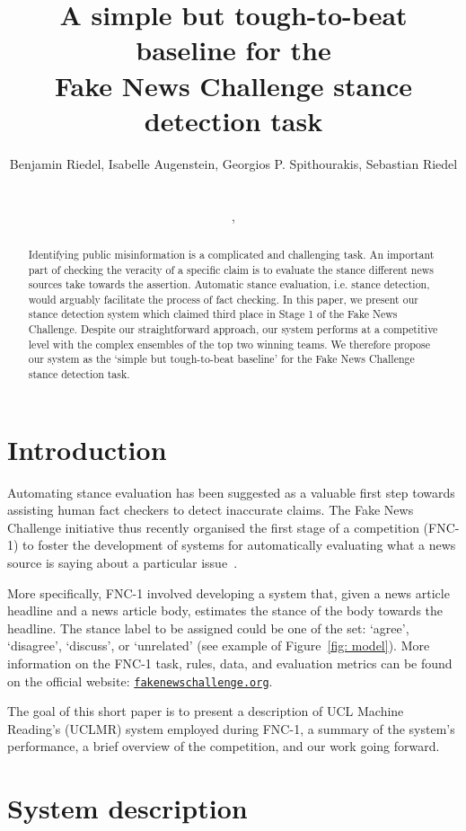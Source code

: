 \documentclass{article}
\title{A simple but tough-to-beat baseline for the \\ Fake News Challenge stance detection task}
\author{Benjamin Riedel\affmark[1], Isabelle Augenstein\affmark[1]\affmark[2], Georgios P. Spithourakis\affmark[1], Sebastian Riedel\affmark[1]\\
\affaddr{\affmark[1]Department of Computer Science, University College London, United Kingdom}\\
\affaddr{\affmark[2]Department of Computer Science, University of Copenhagen, Denmark}\\
\email{benjamin.riedel.09@ucl.ac.uk}, \\ \email{\{i.augenstein|g.spithourakis|s.riedel\}@cs.ucl.ac.uk}
}
\begin{document}
\maketitle

\begin{abstract}
    Identifying public misinformation is a complicated and challenging task. An important part of checking the veracity of a specific claim is to evaluate the stance different news sources take towards the assertion. Automatic stance evaluation, i.e. stance detection, would arguably facilitate the process of fact checking. In this paper, we present our stance detection system which claimed third place in Stage 1 of the Fake News Challenge. Despite our straightforward approach, our system performs at a competitive level with the complex ensembles of the top two winning teams. We therefore propose our system as the `simple but tough-to-beat baseline' for the Fake News Challenge stance detection task.
\end{abstract}

\section{Introduction}

Automating stance evaluation has been suggested as a valuable first step towards assisting human fact checkers to detect inaccurate claims. The Fake News Challenge initiative thus recently organised the first stage of a competition (FNC-1) to foster the development of systems for automatically evaluating what a news source is saying about a particular issue~\cite{fnc}.

More specifically, FNC-1 involved developing a system that, given a news article headline and a news article body, estimates the stance of the body towards the headline. The stance label to be assigned could be one of the set: `agree', `disagree', `discuss', or `unrelated' (see example of Figure~\ref{fig: model}).
More information on the FNC-1 task, rules, data, and evaluation metrics can be found on the official website: \hyperlink{http://www.fakenewschallenge.org}{\texttt{fakenewschallenge.org}}.

The goal of this short paper is to present a description of UCL Machine Reading's (UCLMR) system employed during FNC-1, a summary of the system's performance, a brief overview of the competition, and our work going forward.

\section{System description}
\end{document}

